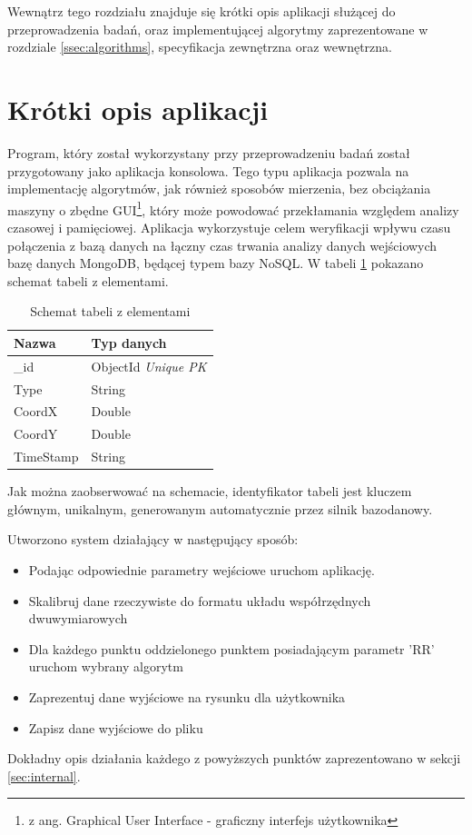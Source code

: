 Wewnątrz tego rozdziału znajduje się krótki opis aplikacji służącej do przeprowadzenia badań, oraz implementującej algorytmy zaprezentowane w rozdziale \ref{ssec:algorithms}, specyfikacja zewnętrzna oraz wewnętrzna.
\section{Krótki opis aplikacji}
\label{sec:shortdesc}
Program, który został wykorzystany przy przeprowadzeniu badań został przygotowany jako aplikacja konsolowa. Tego typu aplikacja pozwala na implementację algorytmów, jak również sposobów mierzenia, bez obciążania maszyny o zbędne GUI\footnote{z ang. Graphical User Interface - graficzny interfejs użytkownika}, który może powodować przekłamania względem analizy czasowej i pamięciowej. Aplikacja wykorzystuje celem weryfikacji wpływu czasu połączenia z bazą danych na łączny czas trwania analizy danych wejściowych bazę danych MongoDB, będącej typem bazy NoSQL. W tabeli \ref{tab:nosqlschema} pokazano schemat tabeli z elementami.
\begin{table}[H]
    \centering
    \begin{tabular}{|l|l|}
    \hline
    \textbf{Nazwa} & \textbf{Typ danych} \\ \hline
    \_id           & ObjectId \textit{Unique PK} \\ \hline
    Type           & String              \\ \hline
    CoordX         & Double              \\ \hline
    CoordY         & Double              \\ \hline
    TimeStamp      & String              \\ \hline
    \end{tabular}
    \caption{Schemat tabeli z elementami}
    \label{tab:nosqlschema}
\end{table}
Jak można zaobserwować na schemacie, identyfikator tabeli jest kluczem głównym, unikalnym, generowanym automatycznie przez silnik bazodanowy.\par
Utworzono system działający w następujący sposób:
\begin{itemize}
        \item Podając odpowiednie parametry wejściowe uruchom aplikację.
        \item Skalibruj dane rzeczywiste do formatu układu współrzędnych dwuwymiarowych
        \item Dla każdego punktu oddzielonego punktem posiadającym parametr 'RR' uruchom wybrany algorytm
        \item Zaprezentuj dane wyjściowe na rysunku dla użytkownika
        \item Zapisz dane wyjściowe do pliku
\end{itemize}
Dokładny opis działania każdego z powyższych punktów zaprezentowano w sekcji \ref{sec:internal}.
